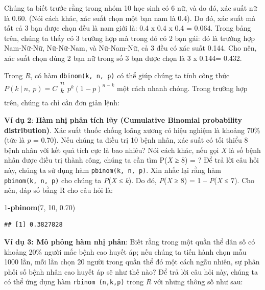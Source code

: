 \documentclass[
]{book}
\newenvironment{Shaded}{\begin{snugshade}}{\end{snugshade}}
\newcommand{\DecValTok}[1]{\textcolor[rgb]{0.00,0.00,0.81}{#1}}
\newcommand{\FloatTok}[1]{\textcolor[rgb]{0.00,0.00,0.81}{#1}}
\newcommand{\KeywordTok}[1]{\textcolor[rgb]{0.13,0.29,0.53}{\textbf{#1}}}
\newcommand{\NormalTok}[1]{#1}
\newcommand{\OperatorTok}[1]{\textcolor[rgb]{0.81,0.36,0.00}{\textbf{#1}}}
\begin{document}
Chúng ta biết trước rằng trong nhóm 10 học sinh có 6 nữ, và do đó, xác suất nữ là 0.60. (Nói cách khác, xác suất chọn một bạn nam là 0.4). Do đó, xác suất mà tất cả 3 bạn được chọn đều là nam giới là: 0.4 x 0.4 x 0.4 = 0.064. Trong bảng trên, chúng ta thấy có 3 trường hợp mà trong đó có 2 bạn gái: đó là trường hợp Nam-Nữ-Nữ, Nữ-Nữ-Nam, và Nữ-Nam-Nữ, cả 3 đều có xác suất 0.144. Cho nên, xác suất chọn đúng 2 bạn nữ trong số 3 bạn được chọn là 3 x 0.144= 0.432.

Trong \(R\), có hàm \texttt{dbinom(k,\ n,\ p)} có thể giúp chúng ta tính công thức
\(P\left( k\ |\ n,\ p \right) = C\begin{matrix} n \\ k \\ \end{matrix}p^{k}\left( 1 - p \right)^{n - k}\) một cách nhanh chóng. Trong trường hợp trên, chúng ta chỉ cần đơn giản lệnh:

\textbf{Ví dụ 2}: \textbf{Hàm nhị phân tích lũy (Cumulative Binomial probability distribution)}. Xác suất thuốc chống loãng xương có hiệu nghiệm là khoảng 70\% (tức là \emph{p} = 0.70). Nếu chúng ta điều trị 10 bệnh nhân, xác suất có tối thiểu 8 bệnh nhân với kết quả tích cực là bao nhiêu? Nói cách khác, nếu gọi \emph{X} là số bệnh nhân được điều trị thành công, chúng ta cần tìm P(\emph{X} ≥ 8) = ? Để trả lời câu hỏi này, chúng ta sử dụng hàm \texttt{pbinom(k,\ n,\ p)}. Xin nhắc lại rằng hàm \texttt{pbinom(k,\ n,\ p)} cho chúng ta \emph{P}(\emph{X} ≤ \emph{k}). Do đó, \emph{P}(\emph{X} ≥ 8) = 1 -- \emph{P}(\emph{X} ≤ 7). Cho nên, đáp số bằng R cho câu hỏi là:

\begin{Shaded}
\begin{Highlighting}[]
\DecValTok{1}\OperatorTok{{-}}\KeywordTok{pbinom}\NormalTok{(}\DecValTok{7}\NormalTok{, }\DecValTok{10}\NormalTok{, }\FloatTok{0.70}\NormalTok{)}
\end{Highlighting}
\end{Shaded}

\begin{verbatim}
## [1] 0.3827828
\end{verbatim}

\textbf{Ví dụ 3: Mô phỏng hàm nhị phân}: Biết rằng trong một quần thể dân số có khoảng 20\% người mắc bệnh cao huyết áp; nếu chúng ta tiến hành chọn mẫu 1000 lần, mỗi lần chọn 20 người trong quần thể đó một cách ngẫu nhiên, sự phân phối số bệnh nhân cao huyết áp sẽ như thế nào? Để trả lời câu hỏi này, chúng ta có thể ứng dụng hàm \texttt{rbinom\ (n,k,p)} trong \(R\) với những thông số như sau:
\end{document}
